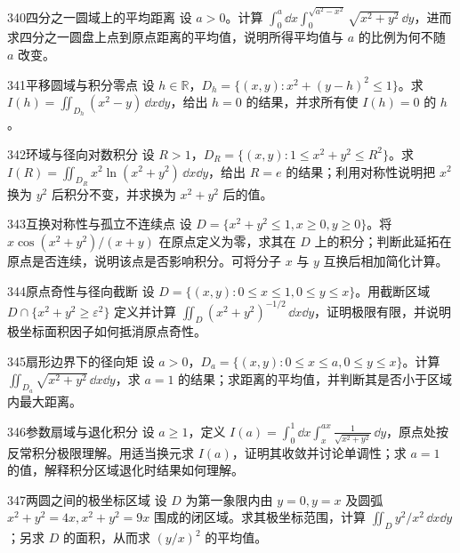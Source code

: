 \begin{exercise}{340}{四分之一圆域上的平均距离}
设 $a>0$。计算 $\int_0^a\dd x\int_0^{\sqrt{a^2-x^2}}\sqrt{x^2+y^2}\,\dd y$，进而求四分之一圆盘上点到原点距离的平均值，说明所得平均值与 $a$ 的比例为何不随 $a$ 改变。
\end{exercise}

\begin{exercise}{341}{平移圆域与积分零点}
设 $h\in\mathbb R$，$D_h=\{(x,y):x^2+(y-h)^2\leq1\}$。求 $I(h)=\iint_{D_h}(x^2-y)\,\dd x\dd y$，给出 $h=0$ 的结果，并求所有使 $I(h)=0$ 的 $h$。
\end{exercise}

\begin{exercise}{342}{环域与径向对数积分}
设 $R>1$，$D_R=\{(x,y):1\leq x^2+y^2\leq R^2\}$。求 $I(R)=\iint_{D_R}x^2\ln(x^2+y^2)\,\dd x\dd y$，给出 $R=e$ 的结果；利用对称性说明把 $x^2$ 换为 $y^2$ 后积分不变，并求换为 $x^2+y^2$ 后的值。
\end{exercise}

\begin{exercise}{343}{互换对称性与孤立不连续点}
设 $D=\{x^2+y^2\leq1,x\geq0,y\geq0\}$。将
$x\cos(x^2+y^2)/(x+y)$ 在原点定义为零，求其在 $D$ 上的积分；判断此延拓在原点是否连续，说明该点是否影响积分。可将分子 $x$ 与 $y$ 互换后相加简化计算。
\end{exercise}

\begin{exercise}{344}{原点奇性与径向截断}
设 $D=\{(x,y):0\leq x\leq1,0\leq y\leq x\}$。用截断区域 $D\cap\{x^2+y^2\geq\varepsilon^2\}$ 定义并计算
$\iint_D(x^2+y^2)^{-1/2}\,\dd x\dd y$，证明极限有限，并说明极坐标面积因子如何抵消原点奇性。
\end{exercise}

\begin{exercise}{345}{扇形边界下的径向矩}
设 $a>0$，$D_a=\{(x,y):0\leq x\leq a,0\leq y\leq x\}$。计算 $\iint_{D_a}\sqrt{x^2+y^2}\,\dd x\dd y$，求 $a=1$ 的结果；求距离的平均值，并判断其是否小于区域内最大距离。
\end{exercise}

\begin{exercise}{346}{参数扇域与退化积分}
设 $a\geq1$，定义 $I(a)=\int_0^1\dd x\int_x^{ax}\frac1{\sqrt{x^2+y^2}}\,\dd y$，原点处按反常积分极限理解。用适当换元求 $I(a)$，证明其收敛并讨论单调性；求 $a=1$ 的值，解释积分区域退化时结果如何理解。
\end{exercise}

\begin{exercise}{347}{两圆之间的极坐标区域}
设 $D$ 为第一象限内由 $y=0,y=x$ 及圆弧 $x^2+y^2=4x,x^2+y^2=9x$ 围成的闭区域。求其极坐标范围，计算 $\iint_Dy^2/x^2\,\dd x\dd y$；另求 $D$ 的面积，从而求 $(y/x)^2$ 的平均值。
\end{exercise}

